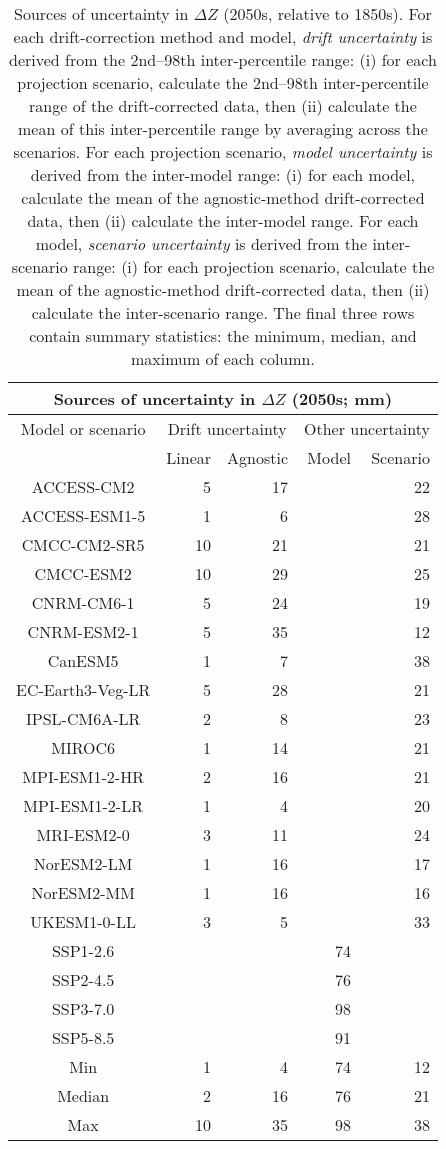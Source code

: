 \begin{table*}[t]
\centering
\caption{Sources of uncertainty in $\Delta Z$ (2050s, relative to 1850s). For each drift-correction method and model, \emph{drift uncertainty} is derived from the 2nd--98th inter-percentile range: (i) for each projection scenario, calculate the 2nd--98th inter-percentile range of the drift-corrected data, then (ii) calculate the mean of this inter-percentile range by averaging across the scenarios. For each projection scenario, \emph{model uncertainty} is derived from the inter-model range: (i) for each model, calculate the mean of the agnostic-method drift-corrected data, then (ii) calculate the inter-model range. For each model, \emph{scenario uncertainty} is derived from the inter-scenario range: (i) for each projection scenario, calculate the mean of the agnostic-method drift-corrected data, then (ii) calculate the inter-scenario range. The final three rows contain summary statistics: the minimum, median, and maximum of each column.}
\begin{tabular}{c|rr|rr}
\toprule
\multicolumn{5}{c}{Sources of uncertainty in $\Delta Z$ (2050s; mm)} \\ 
\midrule
Model or scenario & \multicolumn{2}{c|}{Drift uncertainty} & \multicolumn{2}{c}{Other uncertainty} \\
 & Linear & Agnostic & Model & Scenario \\
\midrule
ACCESS-CM2 & 5 & 17 &  & 22 \\
ACCESS-ESM1-5 & 1 & 6 &  & 28 \\
CMCC-CM2-SR5 & 10 & 21 &  & 21 \\
CMCC-ESM2 & 10 & 29 &  & 25 \\
CNRM-CM6-1 & 5 & 24 &  & 19 \\
CNRM-ESM2-1 & 5 & 35 &  & 12 \\
CanESM5 & 1 & 7 &  & 38 \\
EC-Earth3-Veg-LR & 5 & 28 &  & 21 \\
IPSL-CM6A-LR & 2 & 8 &  & 23 \\
MIROC6 & 1 & 14 &  & 21 \\
MPI-ESM1-2-HR & 2 & 16 &  & 21 \\
MPI-ESM1-2-LR & 1 & 4 &  & 20 \\
MRI-ESM2-0 & 3 & 11 &  & 24 \\
NorESM2-LM & 1 & 16 &  & 17 \\
NorESM2-MM & 1 & 16 &  & 16 \\
UKESM1-0-LL & 3 & 5 &  & 33 \\
SSP1-2.6 &  &  & 74 &  \\
SSP2-4.5 &  &  & 76 &  \\
SSP3-7.0 &  &  & 98 &  \\
SSP5-8.5 &  &  & 91 &  \\
\midrule
Min & 1 & 4 & 74 & 12 \\
Median & 2 & 16 & 76 & 21 \\
Max & 10 & 35 & 98 & 38 \\
\bottomrule
\end{tabular}
\end{table*}
